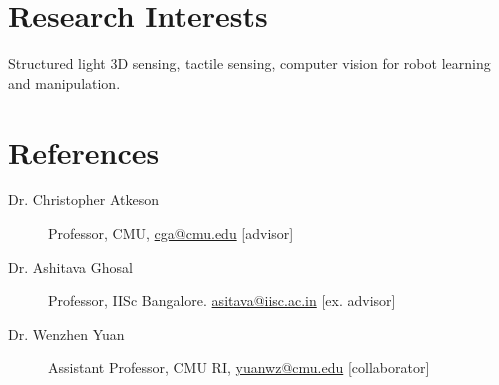 \documentclass[letterpaper,11pt]{article}
\begin{document}
\section{Research Interests}
\begin{description}
\item Structured light 3D sensing, tactile sensing, computer vision for robot learning and manipulation.
\vspace{-0.1 in}
\end{description}



\section{References}
\begin{description}
  \item[Dr. Christopher Atkeson] Professor, CMU, \href{mailto:cga@cmu.edu}{cga@cmu.edu} [advisor]
  \vspace{-0.1 in}
  \item[Dr. Ashitava Ghosal] Professor, IISc Bangalore.  \href{mailto:asitava@iisc.ac.in}{asitava@iisc.ac.in} [ex. advisor]
  \vspace{-0.1 in}
  \item[Dr. Wenzhen Yuan] Assistant Professor, CMU RI, \href{mailto:yuanwz@cmu.edu}{yuanwz@cmu.edu} [collaborator]
  \end{description}
  
\end{document}
